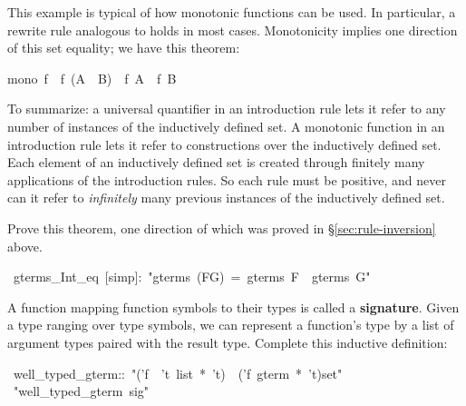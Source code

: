 This example is typical of how monotonic functions can be used.  In
particular, a rewrite rule analogous to  holds in most
cases.  Monotonicity implies one direction of this set equality; we have
this theorem:
\begin{isabelle}
mono\ f\ \isasymLongrightarrow \ f\ (A\ \isasyminter \ B)\ \isasymsubseteq \
f\ A\ \isasyminter \ f\ B%
\end{isabelle}


To summarize: a universal quantifier in an introduction rule 
lets it refer to any number of instances of 
the inductively defined set.  A monotonic function in an introduction 
rule lets it refer to constructions over the inductively defined 
set.  Each element of an inductively defined set is created 
through finitely many applications of the introduction rules.  So each rule
must be positive, and never can it refer to \textit{infinitely} many
previous instances of the inductively defined set. 



\begin{exercise}
Prove this theorem, one direction of which was proved in
{\S}\ref{sec:rule-inversion} above.
\begin{isabelle}
\ gterms_Int_eq\ [simp]:\ "gterms\ (F\isasyminter G)\ =\
gterms\ F\ \isasyminter \ gterms\ G"\isanewline
\end{isabelle}
\end{exercise}


\begin{exercise}
A function mapping function symbols to their 
types is called a \textbf{signature}.  Given a type 
ranging over type symbols, we can represent a function's type by a
list of argument types paired with the result type. 
Complete this inductive definition:
\begin{isabelle}
\ well_typed_gterm::\ "('f\ \isasymRightarrow \ 't\ list\ *\ 't)\ \isasymRightarrow \ ('f\ gterm\ *\ 't)set"\isanewline
{}\ "well_typed_gterm\ sig"\isanewline
\end{isabelle}
\end{exercise}
